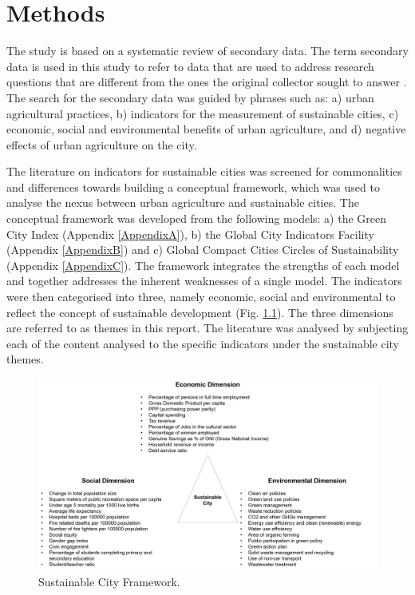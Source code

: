 \chapter{Methods} %

\label{Chapter:Methods}

The study is based on a systematic review of secondary data. The term secondary data is used in this study to refer to data that are used to address research questions that are different from the ones the original collector sought to answer \cite{Vartanian2010}. The search for the secondary data was guided by phrases such as: a) urban agricultural practices, b) indicators for the measurement of sustainable cities, c) economic, social and environmental benefits of urban agriculture, and d) negative effects of urban agriculture on the city. %

The literature on indicators for sustainable cities was screened for commonalities and differences towards building a conceptual framework, which was used to analyse the nexus between urban agriculture and sustainable cities. The conceptual framework was developed from the following models: a) the Green City Index (Appendix \ref{AppendixA}), b) the Global City Indicators Facility (Appendix \ref{AppendixB}) and c) Global Compact Cities Circles of Sustainability (Appendix \ref{AppendixC}). The framework integrates the strengths of each model and together addresses the inherent weaknesses of a single model. The indicators were then categorised into three, namely economic, social and environmental to reflect the concept of sustainable development (Fig. \ref{fig:sustainableCityFramework}). The three dimensions are referred to as themes in this report. The literature was analysed by subjecting each of the content analysed to the specific indicators under the sustainable city themes.

\begin{figure}[th]
\centering
\includegraphics[width=1.00\textwidth]{./Figures/sustainableCityFramework.png}
\decoRule
\caption[Sustainable City Framework]{Sustainable City Framework.}
\label{fig:sustainableCityFramework}
\end{figure}


